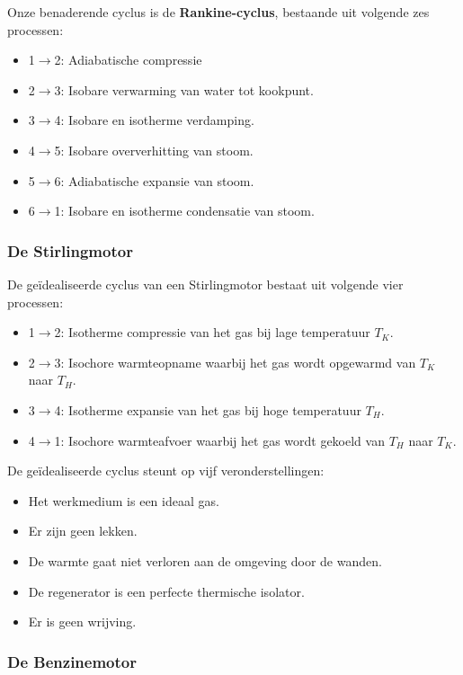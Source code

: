 Onze benaderende cyclus is de \textbf{Rankine-cyclus}, bestaande uit volgende zes processen:
\begin{itemize}
    \item 1\(\to\)2: Adiabatische compressie
    \item 2\(\to\)3: Isobare verwarming van water tot kookpunt.
    \item 3\(\to\)4: Isobare en isotherme verdamping.
    \item 4\(\to\)5: Isobare oververhitting van stoom.
    \item 5\(\to\)6: Adiabatische expansie van stoom.
    \item 6\(\to\)1: Isobare en isotherme condensatie van stoom.
\end{itemize}

\subsubsection{De Stirlingmotor}

De geïdealiseerde cyclus van een Stirlingmotor bestaat uit volgende vier processen:
\begin{itemize}
    \item 1\(\to\)2: Isotherme compressie van het gas bij lage temperatuur \(T_K\).
    \item 2\(\to\)3: Isochore warmteopname waarbij het gas wordt opgewarmd van \(T_K\) naar \(T_H\).
    \item 3\(\to\)4: Isotherme expansie van het gas bij hoge temperatuur \(T_H\).
    \item 4\(\to\)1: Isochore warmteafvoer waarbij het gas wordt gekoeld van \(T_H\) naar \(T_K\).
\end{itemize}

De geïdealiseerde cyclus steunt op vijf veronderstellingen:
\begin{itemize}
    \item Het werkmedium is een ideaal gas.
    \item Er zijn geen lekken.
    \item De warmte gaat niet verloren aan de omgeving door de wanden.
    \item De regenerator is een perfecte thermische isolator.
    \item Er is geen wrijving.
\end{itemize}


\subsubsection{De Benzinemotor}

